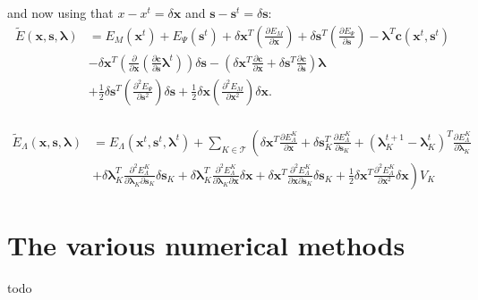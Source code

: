 \documentclass[letterpaper,12pt]{article}
\theoremstyle{remark}
\newcommand{\Th}{\mathcal{T}}
\newcommand{\x}{\mathbf{x}}
\newcommand{\C}{\mathbf{c}}
\newcommand{\s}{\mathbf{s}}
\newcommand{\la}{\mathbf{\lambda}}
\newcommand{\dx}{\delta \x}
\newcommand{\ds}{\delta \s}
\newcommand{\dl}{\delta \la}
\newcommand{\El}{E_\Lambda}
\begin{document}
and now using that $x - x^t = \dx$ and $\s - \s^t = \ds$:
\begin{equation}
\begin{split}
\tilde{E}(\x,\s,\la) &=  E_M(\x^t) + E_\Psi(\s^t) + 
\dx^T \left(\frac{\partial E_M}{\partial \x} \right) 
+ \ds^T \left(\frac{\partial E_\Psi}{\partial \s} \right)   
 - \la^T \C (\x^t, \s^t) \\
& - \dx^T \left(
  \frac{\partial}{\partial \x} \left(\frac{\partial \C}{\partial \s} \la^t\right) \right)\ds
- \left( \dx^T 
  \frac{\partial \C }{\partial \x}
+  \ds^T  
  \frac{\partial \C }{\partial \s} \right) \la \\
& + \frac{1}{2}\ds^T \left(\frac{\partial^2 E_\Psi}{\partial \s^2} \right)\ds
+ \frac{1}{2} \dx \left(\frac{\partial^2 E_M}{\partial \x^2}
\right)\dx. \\
\end{split}
\end{equation}

\begin{equation}
\begin{split}
\tilde{E}_\Lambda (\x, \s, \la) &=  \El (\x^t,\s^t,\la^t) 
+ \sum_{K \in \Th} \left( \right.
  \dx^T \frac{\partial \El^K}{\partial \x} 
+ \ds_K^T \frac{\partial \El^K}{\partial \s_K}
+ (\la_K^{t+1} - \la_K^t)^T \frac{\partial \El^K}{\partial \la_K} \\
&+ \dl_K^T \frac{\partial^2 \El^K}{\partial \la_K \partial \s_K} \ds_K
+ \dl_K^T \frac{\partial^2 \El^K}{\partial \la_K \partial \x} \dx
+ \dx^T \frac{\partial^2 \El^K}{\partial \x \partial \s_K} \ds_K
+ \frac{1}{2} \dx^T \frac{\partial^2 \El^K}{\partial \x^2} \dx
\left. \right) V_K
\end{split}
\end{equation}


\section{The various numerical methods}
todo
\end{document}
